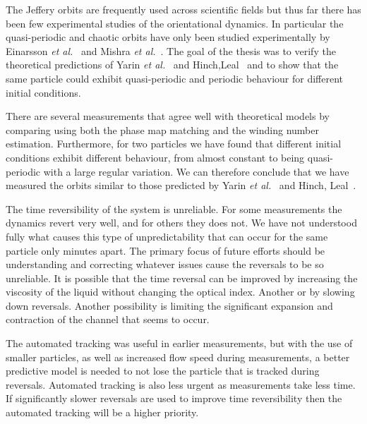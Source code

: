 The Jeffery orbits are frequently used across scientific fields but thus far there has been few experimental studies 
of the orientational dynamics. In particular the quasi-periodic and chaotic orbits have only been studied experimentally
by Einarsson \emph{et al.}~\cite{JonasExperiment} and Mishra \emph{et al.}~\cite{Mishra}.
The goal of the thesis was to verify the theoretical predictions of Yarin \emph{et al.}~\cite{Yarin} and Hinch,Leal~\cite{Leal} and to show that the same particle could exhibit quasi-periodic and periodic behaviour for different initial conditions.


There are several measurements that agree well with theoretical models by comparing using both the phase map matching and the winding number estimation. Furthermore, for two particles we have found that different initial conditions exhibit different behaviour, 
from almost constant to being quasi-periodic with a large regular variation. We can therefore conclude that we have measured the
orbits similar to those predicted by Yarin \emph{et al.}~\cite{Yarin} and Hinch, Leal~\cite{Leal}.

The time reversibility of the system is unreliable. For some measurements the dynamics revert very well, and for others they does not. 
We have not understood fully what causes this type of unpredictability that can occur for the same particle only 
minutes apart. The primary focus of future efforts should be understanding and correcting whatever issues cause the 
reversals to be so unreliable. It is possible that the time reversal can be improved by increasing the viscosity of the liquid
without changing the optical index. Another or by slowing down reversals. Another possibility is limiting the 
significant expansion and contraction of the channel that seems to occur.

The automated tracking was useful in earlier measurements, but with the use of smaller particles, as well as increased flow speed during measurements, 
a better predictive model is needed to not lose the particle that is tracked during reversals. Automated tracking is also less urgent as
measurements take less time. If significantly slower reversals are used to improve time reversibility then the automated tracking will be a higher priority.